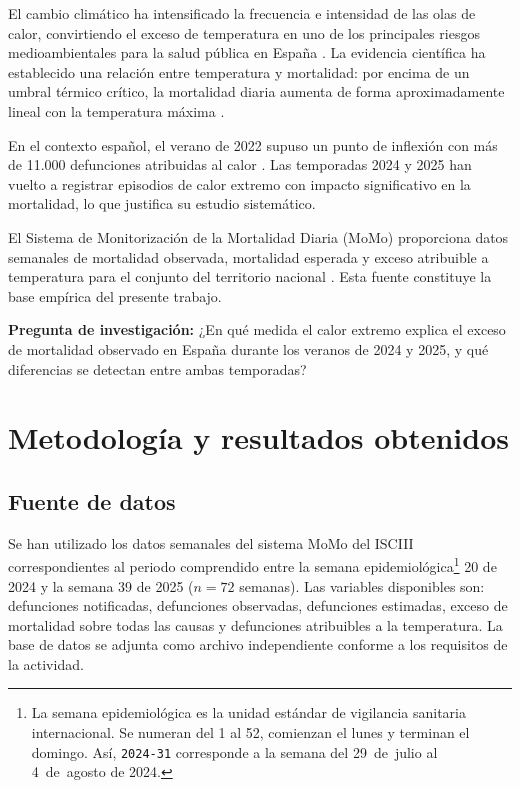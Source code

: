 \documentclass[11pt, a4paper]{article}
\begin{document}
El cambio climático ha intensificado la frecuencia e intensidad de las olas de
calor, convirtiendo el exceso de temperatura en uno
de los principales riesgos medioambientales para la salud pública en España
\cite{inclusion2021}. La evidencia científica ha establecido una relación
entre temperatura y mortalidad: por encima de un umbral térmico
crítico, la mortalidad diaria aumenta de forma aproximadamente lineal con la
temperatura máxima \cite{gasparrini2017}.

En el contexto español, el verano de 2022 supuso un punto de inflexión con más
de 11.000 defunciones atribuidas al calor \cite{momo}. Las temporadas
2024 y 2025 han vuelto a registrar episodios de calor extremo con impacto
significativo en la mortalidad, lo que justifica su estudio sistemático.

El Sistema de Monitorización de la Mortalidad Diaria (MoMo) proporciona
datos semanales de mortalidad observada, mortalidad esperada y exceso
atribuible a temperatura para el conjunto del territorio nacional
\cite{momo}. Esta fuente constituye la base empírica del presente trabajo.

\textbf{Pregunta de investigación:} ¿En qué medida el calor extremo explica el
exceso de mortalidad observado en España durante los veranos de 2024 y 2025,
y qué diferencias se detectan entre ambas temporadas?

\section{Metodología y resultados obtenidos}

\subsection{Fuente de datos}

Se han utilizado los datos semanales del sistema MoMo del ISCIII correspondientes
al periodo comprendido entre la semana epidemiológica\footnote{La semana epidemiológica 
es la unidad estándar de vigilancia sanitaria internacional. Se numeran del 1 al 52, 
comienzan el lunes y terminan el domingo. Así, \texttt{2024-31} corresponde a la 
semana del 29~de~julio al 4~de~agosto de 2024.} 20 de 2024 y la semana
39 de 2025 ($n = 72$ semanas). Las variables disponibles son: defunciones
notificadas, defunciones observadas, defunciones estimadas,
exceso de mortalidad sobre todas las causas y defunciones atribuibles a la
temperatura. La base de datos se adjunta como archivo independiente conforme
a los requisitos de la actividad.
\end{document}
